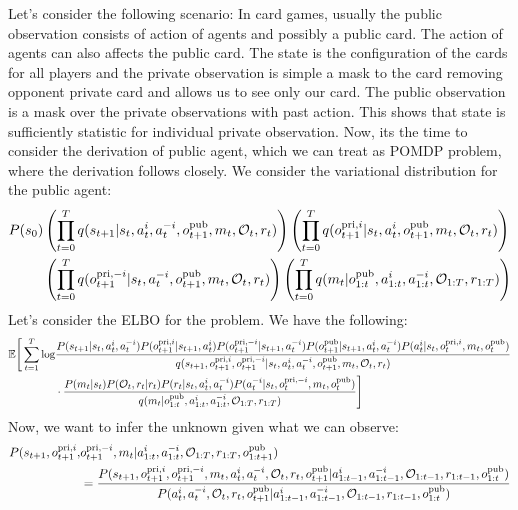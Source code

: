 Let's consider the following scenario: In card games, usually the public observation consists of action of agents and possibly a public card. The action of agents can also affects the public card. The state is the configuration of the cards for all players and the private observation is simple a mask to the card removing opponent private card and allows us to see only our card. The public observation is a mask over the private observations with past action. This shows that state is sufficiently statistic for individual private observation. Now, its the time to consider the derivation of public agent, which we can treat as POMDP problem, where the derivation follows \cite{shvechikovjoint} closely. We consider the variational distribution for the public agent:
\begin{equation}
\begin{aligned}
    P(s_0) &\left( \prod^T_{t=0} q(s_{t+1} | s_t, a^i_t, a^{-i}_t, o^{\operatorname{pub}}_{t+1}, m_t, \mathcal{O}_t, r_t) \right)\left( \prod^T_{t=0}q( o^{\operatorname{pri}, i}_{t+1}| s_t, a^i_t, o^{\operatorname{pub}}_{t+1}, m_t, \mathcal{O}_t, r_t) \right) \\
    &\left( \prod^T_{t=0}q(o^{\operatorname{pri}, -i}_{t+1} | s_t, a^{-i}_t, o^{\operatorname{pub}}_{t+1}, m_t, \mathcal{O}_t, r_t) \right)\left( \prod^T_{t=0} q(m_t | o^{\operatorname{pub}}_{1:t}, a^{i}_{1:t}, a^{-i}_{1:t}, \mathcal{O}_{1:T}, r_{1:T}) \right)
\end{aligned}
\end{equation} 
Let's consider the ELBO for the problem. We have the following:
\begin{equation}
\begin{aligned}
    \mathbb{E}\Bigg[ \sum^T_{t=1} \log &\frac{ P(s_{t+1} | s_t, a_t^i, a_t^{-i})P(o^{\operatorname{pri}, i}_{t+1} | s_{t+1}, a^i_t) P(o^{\operatorname{pri}, -i}_{t+1} | s_{t+1}, a^{-i}_t) P(o^{\operatorname{pub}}_{t+1} | s_{t+1}, a^i_t, a^{-i}_t) P(a^i_t | s_t, o^{\operatorname{pri}, i}_t, m_t, o^{\operatorname{pub}}_t)  }{q(s_{t+1}, o^{\operatorname{pri}, i}_{t+1}, o^{\operatorname{pri}, -i}_{t+1} | s_t, a^i_t, a^{-i}_t, o^{\operatorname{pub}}_{t+1}, m_t, \mathcal{O}_t, r_t)} \\
    &\cdot \frac{P(m_t | s_t) P(\mathcal{O}_t, r_t | r_t)P(r_t | s_t, a^i_t, a^{-i}_t) P(a^{-i}_t | s_t, o^{\operatorname{pri}, -i}_t, m_t, o^{\operatorname{pub}}_t)}{q(m_t | o^{\operatorname{pub}}_{1:t}, a^{i}_{1:t}, a^{-i}_{1:t}, \mathcal{O}_{1:T}, r_{1:T})}  \Bigg]
\end{aligned}
\end{equation}
Now, we want to infer the unknown given what we can observe:
\begin{equation}
\begin{aligned}
    P(s_{t+1}, o^{\operatorname{pri}, i}_{t+1}, &o^{\operatorname{pri}, -i}_{t+1}, m_t | a^{i}_{1:t}, a^{-i}_{1:t}, \mathcal{O}_{1:T}, r_{1:T}, o^{\operatorname{pub}}_{1:t+1}) \\
    &= \frac{P(s_{t+1}, o^{\operatorname{pri}, i}_{t+1}, o^{\operatorname{pri}, -i}_{t+1}, m_t, a^i_t, a^{-i}_t, \mathcal{O}_t, r_t , o^{\operatorname{pub}}_{t+1}| a^{i}_{1:t-1}, a^{-i}_{1:t-1}, \mathcal{O}_{1:t-1}, r_{1:t-1}, o^{\operatorname{pub}}_{1:t})}{P(a^i_t, a^{-i}_t, \mathcal{O}_t, r_t, o^{\operatorname{pub}}_{t+1} | a^{i}_{1:t-1}, a^{-i}_{1:t-1}, \mathcal{O}_{1:t-1}, r_{1:t-1}, o^{\operatorname{pub}}_{1:t})}
\end{aligned}
\end{equation}
